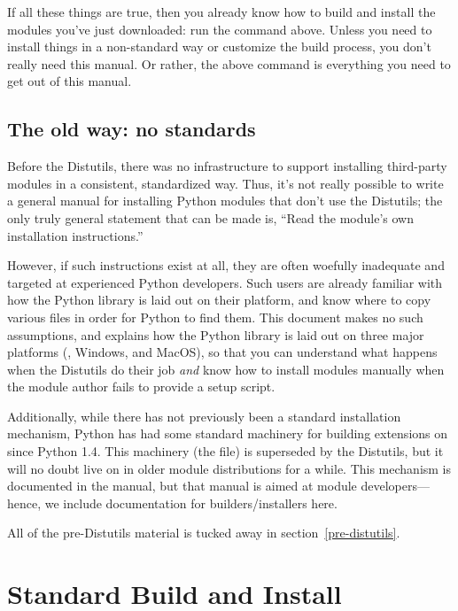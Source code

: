 \documentclass{howto}
\begin{document}
If all these things are true, then you already know how to build and
install the modules you've just downloaded: run the command above.
Unless you need to install things in a non-standard way or customize the
build process, you don't really need this manual.  Or rather, the above
command is everything you need to get out of this manual.


\subsection{The old way: no standards}
\label{old-way}

Before the Distutils, there was no infrastructure to support installing
third-party modules in a consistent, standardized way.  Thus, it's not
really possible to write a general manual for installing Python modules
that don't use the Distutils; the only truly general statement that can
be made is, ``Read the module's own installation instructions.''

However, if such instructions exist at all, they are often woefully
inadequate and targeted at experienced Python developers.  Such users
are already familiar with how the Python library is laid out on their
platform, and know where to copy various files in order for Python to
find them.  This document makes no such assumptions, and explains how
the Python library is laid out on three major platforms (\UNIX, Windows,
and MacOS), so that you can understand what happens when the Distutils
do their job \emph{and} know how to install modules manually when the
module author fails to provide a setup script.

Additionally, while there has not previously been a standard
installation mechanism, Python has had some standard machinery for
building extensions on \UNIX{} since Python 1.4.  This
machinery (the  file) is superseded by the
Distutils, but it will no doubt live on in older module distributions
for a while.  This  mechanism is documented in
the  manual,
but that manual is aimed at module developers---hence, we include
documentation for builders/installers here.

All of the pre-Distutils material is tucked away in
section~\ref{pre-distutils}.


\section{Standard Build and Install}
\label{standard-install}
\end{document}

